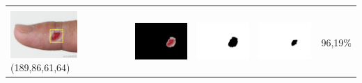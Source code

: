 \begin{table}[H]
\begin{tabular}{|m{1.0in}|m{1.0in}|m{1.0in}|m{1.0in}|m{0.6in}|}
		&  &  & \\
		\includegraphics[width=1.0in]{gambar/hasil_segmentasi/luka_merah/image_44_rect.jpg} {\centering\fontsize{10}{10}\selectfont(189,86,61,64)}&
		\includegraphics[width=1.0in]{gambar/hasil_segmentasi/luka_merah/result_44.jpg}&
		\includegraphics[width=1.0in]{gambar/hasil_segmentasi/luka_merah/mask_r_44.jpg}&
		\includegraphics[width=1.0in]{gambar/hasil_segmentasi/luka_merah/44_r.jpg}&
		96,19\% \\
		\hline
	\end{tabular}
\end{table}

